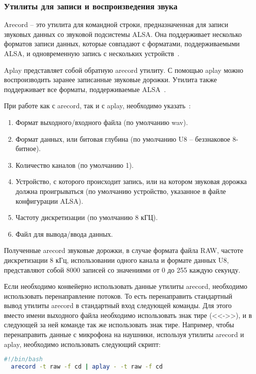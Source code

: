 \subsubsection{Утилиты для записи и воспроизведения звука}

Arecord -- это утилита для командной строки, предназначенная для записи звуковых данных со звуковой подсистемы ALSA. Она поддерживает несколько форматов записи данных, которые совпадают с форматами, поддерживаемыми ALSA, и одновременную запись с нескольких устройств~\cite{arecord}.

Aplay представляет собой обратную arecord утилиту. С помощью aplay можно воспроизводить заранее записанные звуковые дорожки. Утилита также поддерживает все форматы, поддерживаемые ALSA~\cite{aplay}.

При работе как с arecord, так и с aplay, необходимо указать~\cite{arecord, aplay}:

\begin{enumerate}
  \item Формат выходного/входного файла (по умолчанию wav).
  \item Формат данных, или битовая глубина (по умолчанию U8 -- беззнаковое 8-битное).
  \item Количество каналов (по умолчанию 1).
  \item Устройство, с которого происходит запись, или на котором звуковая дорожка должна проигрываться (по умолчанию устройство, указанное в файле конфигурации ALSA).
  \item Частоту дискретизации (по умолчанию 8 кГЦ).
  \item Файл для вывода/ввода данных.
\end{enumerate}

Полученные arecord звуковые дорожки, в случае формата файла RAW, частоте дискретизации 8 кГц, использовании одного канала и формате данных U8, представляют собой 8000 записей со значениями от 0 до 255 каждую секунду.

Если необходимо конвейерно использовать данные утилиты arecord, необходимо использовать перенаправление потоков. То есть перенаправить стандартный вывод утилиты arecord в стандартный вход следующей команды. Для этого вместо имени выходного файла необходимо использовать знак тире (<<->>), и в следующей за ней команде так же использовать знак тире. Например, чтобы перенаправить данные с микрофона на наушники, используя утилиты arecord и aplay, необходимо использовать следующий скрипт:

\begin{lstlisting}[style=ES6, language=bash]
  #!/bin/bash
  arecord -t raw -f cd | aplay - -t raw -f cd
\end{lstlisting}
